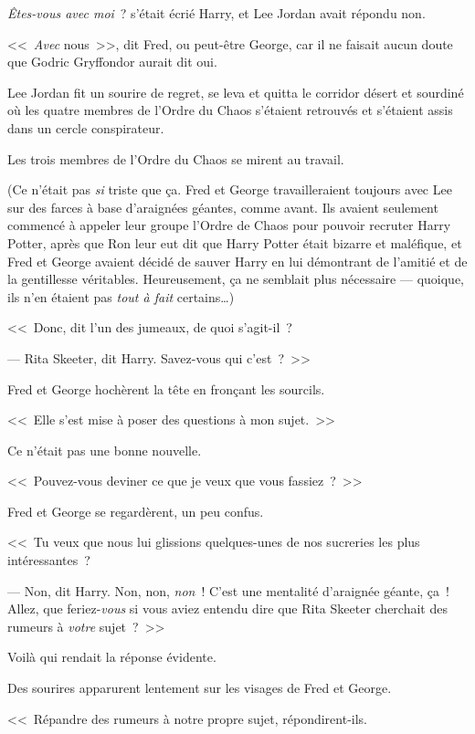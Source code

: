 \emph{Êtes-vous avec moi}~? s'était écrié Harry, et Lee Jordan avait répondu non.

<<~\emph{Avec} nous~>>, dit Fred, ou peut-être George, car il ne faisait aucun doute que Godric Gryffondor aurait dit oui.

Lee Jordan fit un sourire de regret, se leva et quitta le corridor désert et sourdiné où les quatre membres de l'Ordre du Chaos s'étaient retrouvés et s'étaient assis dans un cercle conspirateur.

Les trois membres de l'Ordre du Chaos se mirent au travail.

(Ce n'était pas \emph{si} triste que ça. Fred et George travailleraient toujours avec Lee sur des farces à base d'araignées géantes, comme avant. Ils avaient seulement commencé à appeler leur groupe l'Ordre de Chaos pour pouvoir recruter Harry Potter, après que Ron leur eut dit que Harry Potter était bizarre et maléfique, et Fred et George avaient décidé de sauver Harry en lui démontrant de l'amitié et de la gentillesse véritables. Heureusement, ça ne semblait plus nécessaire — quoique, ils n'en étaient pas \emph{tout à fait} certains…)

<<~Donc, dit l'un des jumeaux, de quoi s'agit-il~?

--- Rita Skeeter, dit Harry. Savez-vous qui c'est~?~>>

Fred et George hochèrent la tête en fronçant les sourcils.

<<~Elle s'est mise à poser des questions à mon sujet.~>>

Ce n'était pas une bonne nouvelle.

<<~Pouvez-vous deviner ce que je veux que vous fassiez~?~>>

Fred et George se regardèrent, un peu confus.

<<~Tu veux que nous lui glissions quelques-unes de nos sucreries les plus intéressantes~?

--- Non, dit Harry. Non, non, \emph{non}~! C'est une mentalité d'araignée géante, ça~! Allez, que feriez-\emph{vous} si vous aviez entendu dire que Rita Skeeter cherchait des rumeurs à \emph{votre} sujet~?~>>

Voilà qui rendait la réponse évidente.

Des sourires apparurent lentement sur les visages de Fred et George.

<<~Répandre des rumeurs à notre propre sujet, répondirent-ils.

